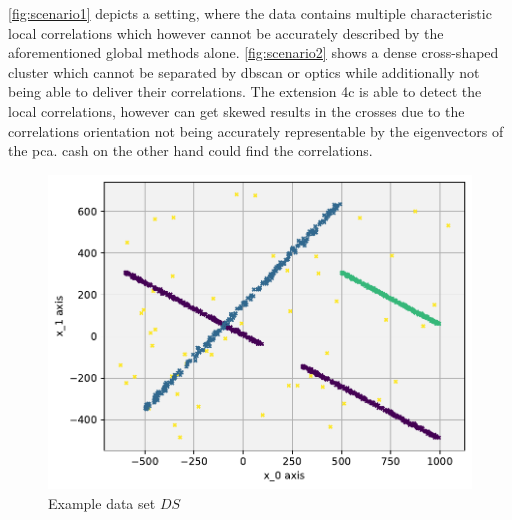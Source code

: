 \autoref{fig:scenario1}  depicts a setting, where the data contains multiple characteristic local correlations which however cannot be accurately described by the aforementioned global methods alone. 
\autoref{fig:scenario2} shows a dense cross-shaped cluster which cannot be separated by \gls{dbscan} or \gls{optics} while additionally not being able to deliver their correlations. 
The extension \gls{4c} is able to detect the local correlations, however can get skewed results in the crosses due to the correlations orientation not being accurately representable by the eigenvectors of the \gls{pca}\cite{PCAshlens2014tutorial}. 
\gls{cash} on the other hand could find the correlations. 

\begin{figure}
    \centering
    \includegraphics[width=.7\textwidth]{figures_method/Groundtruth.pdf}
    \caption{Example data set $DS$}
    \label{fig:localglobalproblem}
\end{figure}

